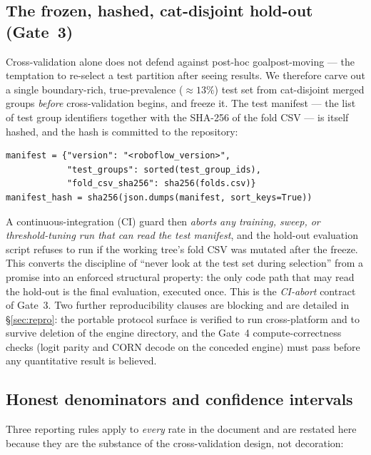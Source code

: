 \subsection{The frozen, hashed, cat-disjoint hold-out (Gate~3)}

Cross-validation alone does not defend against post-hoc goalpost-moving --- the temptation to
re-select a test partition after seeing results. We therefore carve out a single
boundary-rich, true-prevalence ($\approx 13\%$) test set from cat-disjoint merged groups
\emph{before} cross-validation begins, and freeze it. The test manifest --- the list of test
group identifiers together with the SHA-256 of the fold CSV --- is itself hashed, and the hash
is committed to the repository:

\begin{verbatim}
manifest = {"version": "<roboflow_version>",
            "test_groups": sorted(test_group_ids),
            "fold_csv_sha256": sha256(folds.csv)}
manifest_hash = sha256(json.dumps(manifest, sort_keys=True))
\end{verbatim}

A continuous-integration (CI) guard then \emph{aborts any training, sweep, or
threshold-tuning run that can read the test manifest}, and the hold-out evaluation script
refuses to run if the working tree's fold CSV was mutated after the freeze. This converts the
discipline of ``never look at the test set during selection'' from a promise into an enforced
structural property: the only code path that may read the hold-out is the final evaluation,
executed once. This is the \emph{CI-abort} contract of Gate~3. Two further reproducibility
clauses are blocking and are detailed in \S\ref{sec:repro}: the portable protocol surface is
verified to run cross-platform and to survive deletion of the engine directory, and the Gate~4
compute-correctness checks (logit parity and CORN decode on the conceded engine) must pass
before any quantitative result is believed.

\subsection{Honest denominators and confidence intervals}

Three reporting rules apply to \emph{every} rate in the document and are restated here because
they are the substance of the cross-validation design, not decoration:

